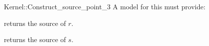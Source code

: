 \begin{ccRefFunctionObjectConcept}{Kernel::Construct_source_point_3}
A model for this must provide:


{returns the source of $r$.}

{returns the source of $s$.}

\end{ccRefFunctionObjectConcept}
